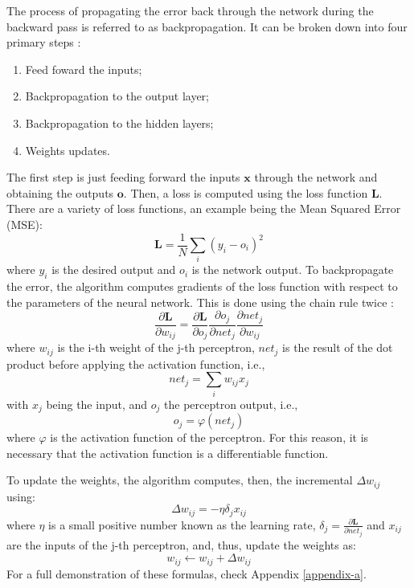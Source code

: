 The process of propagating the error back through the network during the backward pass is referred to as backpropagation. It can be broken down into four primary steps \cite{cilimkovic2015neural}:

\begin{enumerate}
    \item Feed foward the inputs;
    \item Backpropagation to the output layer;
    \item Backpropagation to the hidden layers;
    \item Weights updates.
\end{enumerate}

The first step is just feeding forward the inputs $\mathbf{x}$ through the network and obtaining the outputs $\mathbf{o}$. Then, a loss is computed using the loss function $\mathbf{L}$. There are a variety of loss functions, an example being the Mean Squared Error (MSE):
\begin{equation}
    \mathbf{L} = \frac{1}{N} \sum_{i} \left(y_i-o_i\right)^2
\end{equation}
where $y_i$ is the desired output and $o_i$ is the network output. To backpropagate the error, the algorithm computes gradients of the loss function with respect to the parameters of the neural network. This is done using the chain rule twice \cite{Roth_2016}:
\begin{equation}
    \frac{\partial \mathbf{L}}{\partial w_{ij}} = \frac{\partial \mathbf{L}}{\partial o_j}
    \frac{\partial o_j}{\partial net_j}\frac{\partial net_j}{\partial w_{ij}}
\end{equation}
where $w_{ij}$ is the i-th weight of the j-th perceptron, $net_j$ is the result of the dot product before applying the activation function, i.e.,
\begin{equation}
    net_j = \sum_i w_{ij} x_j
\end{equation}
with $x_j$ being the input, and $o_j$ the perceptron output, i.e.,
\begin{equation}
    o_j = \varphi (net_j)    
\end{equation}
where $\varphi$ is the activation function of the perceptron. For this reason, it is necessary that the activation function is a differentiable function. 

To update the weights, the algorithm computes, then, the incremental $\Delta w_{ij}$ using:
\begin{equation}
    \Delta w_{ij} = -\eta \delta_j x_{ij}
\end{equation}
where $\eta$ is a small positive number known as the learning rate, $\delta_j = \frac{\partial \mathbf{L}}{\partial net_j}$ and $x_{ij}$ are the inputs of the j-th perceptron, and, thus, update the weights as:
\begin{equation}
    w_{ij} \xleftarrow{} w_{ij} + \Delta w_{ij}
\end{equation}
For a full demonstration of these formulas, check Appendix \ref{appendix-a}. 


